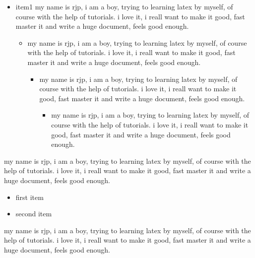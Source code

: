 \documentclass[a4paper, UTF8]{article}
\begin{document}
\begin{itemize}
    \item item1 my name is rjp, i am a boy, trying to learning latex by myself, of course with the help of tutorials. i love it, i reall want to make it good, fast master it and write a huge document, feels good enough. 
        \begin{itemize}
            \item my name is rjp, i am a boy, trying to learning latex by myself, of course with the help of tutorials. i love it, i reall want to make it good, fast master it and write a huge document, feels good enough.
            \begin{itemize}
                \item my name is rjp, i am a boy, trying to learning latex by myself, of course with the help of tutorials. i love it, i reall want to make it good, fast master it and write a huge document, feels good enough.
                    \begin{itemize}
                        \item my name is rjp, i am a boy, trying to learning latex by myself, of course with the help of tutorials. i love it, i reall want to make it good, fast master it and write a huge document, feels good enough.
                    \end{itemize}
            \end{itemize}
        \end{itemize}
\end{itemize}

my name is rjp, i am a boy, trying to learning latex by myself, of course with the help of tutorials. i love it, i reall want to make it good, fast master it and write a huge document, feels good enough.

\renewcommand{\labelitemi}{$\triangleright$}
\begin{itemize}
	\item first item
	\item second item
\end{itemize}

my name is rjp, i am a boy, trying to learning latex by myself, of course with the help of tutorials. i love it, i reall want to make it good, fast master it and write a huge document, feels good enough.
\end{document}
